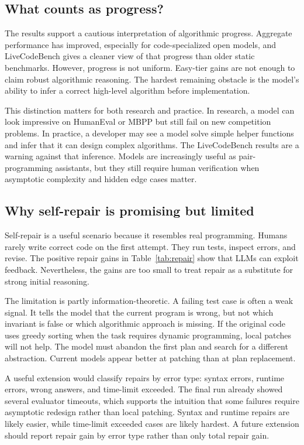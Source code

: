 \documentclass[11pt]{article}
\newcommand{\lcb}{LiveCodeBench}
\begin{document}
\subsection{What counts as progress?}
The results support a cautious interpretation of algorithmic progress. Aggregate performance has improved, especially for code-specialized open models, and \lcb{} gives a cleaner view of that progress than older static benchmarks. However, progress is not uniform. Easy-tier gains are not enough to claim robust algorithmic reasoning. The hardest remaining obstacle is the model's ability to infer a correct high-level algorithm before implementation.

This distinction matters for both research and practice. In research, a model can look impressive on HumanEval or MBPP but still fail on new competition problems. In practice, a developer may see a model solve simple helper functions and infer that it can design complex algorithms. The \lcb{} results are a warning against that inference. Models are increasingly useful as pair-programming assistants, but they still require human verification when asymptotic complexity and hidden edge cases matter.

\subsection{Why self-repair is promising but limited}
Self-repair is a useful scenario because it resembles real programming. Humans rarely write correct code on the first attempt. They run tests, inspect errors, and revise. The positive repair gains in Table~\ref{tab:repair} show that LLMs can exploit feedback. Nevertheless, the gains are too small to treat repair as a substitute for strong initial reasoning.

The limitation is partly information-theoretic. A failing test case is often a weak signal. It tells the model that the current program is wrong, but not which invariant is false or which algorithmic approach is missing. If the original code uses greedy sorting when the task requires dynamic programming, local patches will not help. The model must abandon the first plan and search for a different abstraction. Current models appear better at patching than at plan replacement.

A useful extension would classify repairs by error type: syntax errors, runtime errors, wrong answers, and time-limit exceeded. The final run already showed several evaluator timeouts, which supports the intuition that some failures require asymptotic redesign rather than local patching. Syntax and runtime repairs are likely easier, while time-limit exceeded cases are likely hardest. A future extension should report repair gain by error type rather than only total repair gain.
\end{document}
